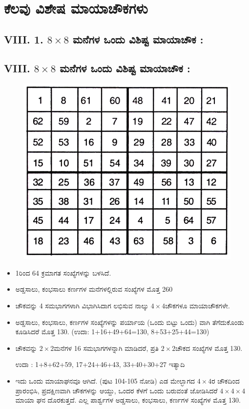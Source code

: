 \chapter{ಕೆಲವು ವಿಶೇಷ ಮಾಯಾಚೌಕಗಳು}

\section*{VIII. 1. $8 \times 8$ ಮನೆಗಳ ಒಂದು ವಿಶಿಷ್ಟ ಮಾಯಾಚೌಕ :}

\section*{VIII. $8 \times 8$ ಮನೆಗಳ ಒಂದು ವಿಶಿಷ್ಟ ಮಾಯಾಚೌಕ :}
\begin{figure}[H]
\includegraphics[scale=.85]{src/figures/chap7/fig7-1.jpg}
\end{figure}

\begin{itemize}
	\item 1ರಿಂದ 64 ಕ್ರಮಾಗತ ಸಂಖ್ಯೆಗಳನ್ನು ಬಳಸಿದೆ.
	\item ಅಡ್ಡಸಾಲು, ಕಂಭಸಾಲು ಕರ್ಣಗಳ ಮನೆಗಳಲ್ಲಿರುವ ಸಂಖ್ಯೆಗಳ ಮೊತ್ತ 260
	\item ಚೌಕವನ್ನು 4 ಸಮಭಾಗಗಳಾಗಿ ವಿಭಾಗಿಸಿದಾಗ ಲಭಿಸುವ ನಾಲ್ಕು $4 \times 4$ಚೌಕಗಳೂ ಮಾಯಾಚೌಕಗಳೇ.
	\item ಅಡ್ಡಸಾಲು, ಕಂಭಸಾಲು, ಕರ್ಣಗಳ ಸಂಖ್ಯೆಗಳನ್ನು ಪರ್ಯಾಯ \break (ಒಂದು ಬಿಟ್ಟು ಒಂದು) ವಾಗಿ ತೆಗೆದುಕೊಂಡು ಕೂಡಿಸಿದರೆ ಮೊತ್ತ 130. (ಉದಾ: 1+16+49+64=130, 8+53+25+44=130)
	\item ಚೌಕವನ್ನು $2 \times 2$ಮನೆಗಳ 16 ಸಮಭಾಗಗಳನ್ನಾಗಿ ಮಾಡಿದರೆ, ಪ್ರತಿ $2 \times 2$ಚೌಕದ ಸಂಖ್ಯೆಗಳ ಮೊತ್ತ 130.

	ಉದಾ : 1+8+62+59, 17+24+46+43, 33+40+30+27 ಇತ್ಯಾದಿ
	\item ಇದು ಒಂದು ಮಾಯಾಘನವೂ ಆಗಿದೆ. (ಪುಟ 104-105 ನೋಡಿ) ಎಡ \hbox{ಮೇಲ್ಭಾಗದ} $4 \times 4$ರ ಚೌಕದಿಂದ ಪ್ರಾರಂಭಿಸಿ, ಪ್ರದಕ್ಷಿಣವಾಗಿ ಚೌಕಗಳನ್ನು ಆಯ್ದು, ಒಂದರ ಕೆಳಗೆ ಒಂದು ಬರುವಂತೆ ಜೋಡಿಸಿದರೆ $4 \times 4 \times 4$ ಮಾಯಾ ಘನ ದೊರಕು\-ತ್ತದೆ. ಎಲ್ಲ ಪಾರ್ಶ್ವಗಳ ಅಡ್ಡಸಾಲು, ಕಂಭಸಾಲು, ಕರ್ಣಗಳ ಸಂಖ್ಯೆಗಳ ಮೊತ್ತ 130.
\end{itemize}

